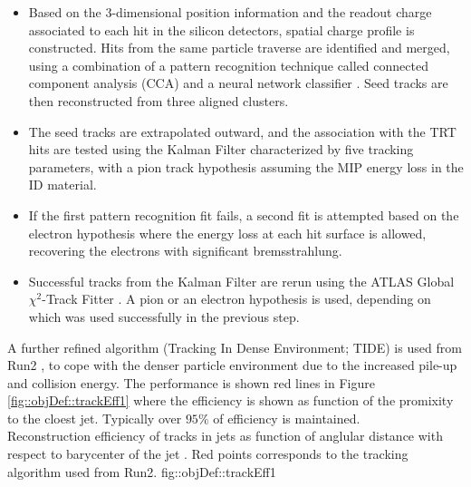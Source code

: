 \begin{itemize}
\item Based on the 3-dimensional position information and the readout charge associated to each hit in the silicon detectors, 
spatial charge profile is constructed. 
Hits from the same particle traverse are identified and merged, using a combination of a pattern recognition technique called connected component analysis (CCA) \cite{CCApatterRecog} and a neural network classifier \cite{NNClustering}.
Seed tracks are then reconstructed from three aligned clusters.

\item The seed tracks are extrapolated outward,
and the association with the TRT hits are tested using the Kalman Filter \cite{133_KalmanFitter} characterized by five tracking parameters,
with a pion track hypothesis assuming the MIP energy loss in the ID material.

\item If the first pattern recognition fit fails, a second fit is attempted based on the electron hypothesis where the energy loss at each hit surface is allowed, recovering the electrons with significant bremsstrahlung.

\item Successful tracks from the Kalman Filter are rerun using the ATLAS Global $\chi^2$-Track Fitter \cite{157_ATLASGlobTrackFitter}.
A pion or an electron hypothesis is used, depending on which was used successfully in the previous step.

\end{itemize}
A further refined algorithm (Tracking In Dense Environment; TIDE) is used from Run2 \cite{130_trackingRun2}, 
to cope with the denser particle environment due to the increased pile-up and collision energy.
The performance is shown red lines in Figure \ref{fig::objDef::trackEff1} where the efficiency is shown as function of the promixity to the cloest jet. Typically over $95\%$ of efficiency is maintained. \\ 

{Reconstruction efficiency of tracks in jets as function of anglular distance with respect to barycenter of the jet \cite{130_trackingRun2}. Red points corresponds to the tracking algorithm used from Run2.
}
{fig::objDef::trackEff1}



